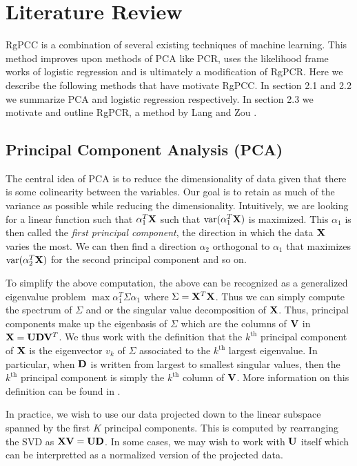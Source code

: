\documentclass[main.tex]{subfiles}
\begin{document}
\section{Literature Review}
RgPCC is a combination of several existing techniques of machine learning. This method improves upon methods of PCA like PCR, uses the likelihood frame works of logistic regression and is ultimately a modification of RgPCR. Here we describe the following methods that have motivate RgPCC. In section 2.1 and 2.2 we summarize PCA and logistic regression respectively. In section 2.3 we motivate and outline RgPCR, a method by Lang and Zou \citep{langzou}.

%
%
%
%
%
%
%
%
%
%
%

\subsection{Principal Component Analysis (PCA)}
The central idea of PCA is to reduce the dimensionality of data given that there is some colinearity between the variables. Our goal is to retain as much of the variance as possible while reducing the dimensionality. Intuitively, we are looking for a linear function such that $\alpha_1^T \mathbf{X}$ such that $\text{var}(\alpha_1^T \mathbf{X})$ is maximized. This $\alpha_1$ is then called the \emph{first principal component}, the direction in which the data $\mathbf{X}$ varies the most. We can then find a direction $\alpha_2$ orthogonal to $\alpha_1$ that maximizes $\text{var}(\alpha^T_2 \mathbf{X})$ for the second principal component and so on. 

To simplify the above computation, the above can be recognized as a generalized eigenvalue problem $\max \alpha_1^T \Sigma \alpha_1$ where $\Sigma = \mathbf{X}^T \mathbf{X}$. Thus we can simply compute the spectrum of $\Sigma$ and or the singular value decomposition of $\mathbf{X}$. Thus, principal components make up the eigenbasis of $\Sigma$ which are the columns of $\mathbf{V}$ in $\mathbf{X} = \mathbf{U} \mathbf{D} \mathbf{V}^T$. We thus work with the definition that the $k^{\text{th}}$ principal component of $\mathbf{X}$ is the eigenvector $v_k$ of $\Sigma$ associated to the $k^{\text{th}}$ largest eigenvalue. In particular, when $\mathbf{D}$ is written from largest to smallest singular values, then the $k^{\text{th}}$ principal component is simply the $k^{\text{th}}$ column of $\mathbf{V}$. More information on this definition can be found in \cite{PCA}.

In practice, we wish to use our data projected down to the linear subspace spanned by the first $K$ principal components. This is computed by rearranging the SVD as $\mathbf{X} \mathbf{V} = \mathbf{U} \mathbf{D}$. In some cases, we may wish to work with $\mathbf{U}$ itself which can be interpretted as a normalized version of the projected data.
\end{document}
